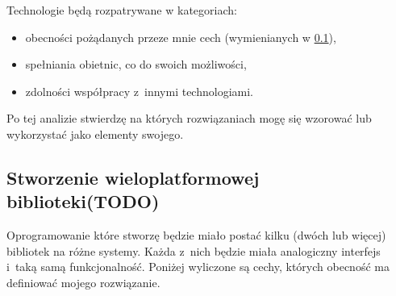 Technologie będą rozpatrywane w kategoriach:
\begin{itemize}
	\item obecności pożądanych przeze mnie cech (wymienianych w \ref{lib_requirements}),
	\item spełniania obietnic, co do swoich możliwości,
	\item zdolności współpracy z~innymi technologiami.
\end{itemize}

Po tej analizie stwierdzę na których rozwiązaniach mogę się wzorować lub wykorzystać jako elementy swojego.

\subsection{Stworzenie wieloplatformowej biblioteki(TODO)}
\label{lib_requirements}
Oprogramowanie które stworzę będzie miało postać kilku (dwóch lub więcej) bibliotek na różne systemy. Każda z~nich będzie miała analogiczny interfejs i~taką samą funkcjonalność. Poniżej wyliczone są cechy, których obecność ma definiować mojego rozwiązanie.

